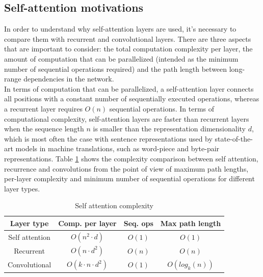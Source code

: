 \documentclass[\main/main.tex]{subfiles}
\begin{document}
\subsection{Self-attention motivations}
In order to understand why self-attention layers are used, it's necessary to compare them with recurrent and convolutional layers. There are three aspects that are important to consider: the total computation complexity per layer, the amount of computation that can be parallelized (intended as the minimum number of sequential operations required) and the path length between long-range dependencies in the network. \\
In terms of computation that can be parallelized, a self-attention layer connects all positions with a constant number of sequentially executed operations, whereas a recurrent layer requires $O(n)$ sequential operations. In terms of computational complexity, self-attention layers are faster than recurrent layers when the sequence length $n$ is smaller than the representation dimensionality $d$, which is most often the case with sentence representations used by state-of-the-art models in machine translations, such as word-piece and byte-pair representations. Table \ref{table:complexity_self_attention} shows the complexity comparison between self attention, recurrence and convolutions from the point of view of maximum path lengths, per-layer complexity and minimum number of sequential operations for different layer types. 

\begin{table}[H]
\centering
\begin{tabular}{||c c c c||} 
 \hline
 Layer type & Comp. per layer & Seq. ops & Max path length \\ [0.5ex] 
 \hline\hline
 Self attention & $O(n^2 \cdot d)$ & $O(1)$ & $O(1)$ \\ 
 \hline
 Recurrent & $O(n \cdot d^2)$ & $O(n)$ & $O(n)$ \\
 \hline
 Convolutional & $O(k \cdot n \cdot d^2)$ & $O(1)$ & $O(log_k(n))$ \\
 \hline
 
\end{tabular}
\caption{Self attention complexity}
 \label{table:complexity_self_attention}
\end{table}
\end{document}
